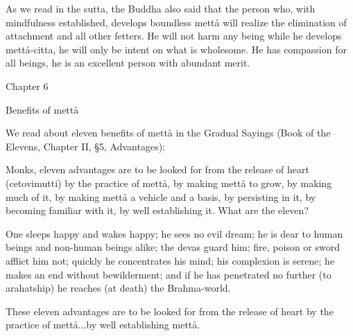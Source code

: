 \documentclass[12pt,twoside]{article}
\begin{document}
As we read in the sutta, the Buddha also said that the person who, with
mindfulness established, develops boundless mett{\aa} will realize the
elimination of attachment and all other
{\textasciigrave}{\textasciigrave}fetters{\textquotesingle}{\textquotesingle}.
He will not harm any being while he develops mett{\aa}{}-citta, he will
only be intent on what is wholesome. He has compassion for all beings,
he is an excellent person with abundant merit. 


\bigskip

\clearpage
Chapter 6


\bigskip


\bigskip

Benefits of mett{\aa}


\bigskip


\bigskip

We read about eleven benefits of mett{\aa} in the Gradual Sayings (Book
of the Elevens, Chapter II, {\S}5, Advantages):


\bigskip

Monks, eleven advantages are to be looked for from the release of heart
(cetovimutti) by the practice of mett{\aa}, by making mett{\aa} to
grow, by making much of it, by making mett{\aa} a vehicle and a basis,
by persisting in it, by becoming familiar with it, by well establishing
it. What are the eleven?

One sleeps happy and wakes happy; he sees no evil dream; he is dear to
human beings and non{}-human beings alike; the devas guard him; fire,
poison or sword afflict him not; quickly he concentrates his mind; his
complexion is serene; he makes an end without bewilderment; and if he
has penetrated no further (to arahatship) he reaches (at death) the
Brahma{}-world. 

These eleven advantages are to be looked for from the release of heart
by the practice of mett{\aa}...by well establishing mett{\aa}. 


\bigskip
\end{document}
